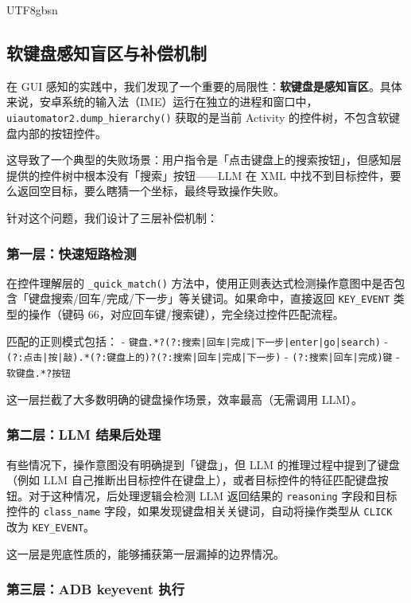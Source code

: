 \documentclass{article}
\begin{document}
\begin{CJK}{UTF8}{gbsn}
\subsection{软键盘感知盲区与补偿机制}

在 GUI 感知的实践中，我们发现了一个重要的局限性：\textbf{软键盘是感知盲区}。具体来说，安卓系统的输入法（IME）运行在独立的进程和窗口中，\texttt{uiautomator2.dump\_hierarchy()} 获取的是当前 Activity 的控件树，不包含软键盘内部的按钮控件。

这导致了一个典型的失败场景：用户指令是「点击键盘上的搜索按钮」，但感知层提供的控件树中根本没有「搜索」按钮——LLM 在 XML 中找不到目标控件，要么返回空目标，要么瞎猜一个坐标，最终导致操作失败。

针对这个问题，我们设计了三层补偿机制：

\subsubsection{第一层：快速短路检测}

在控件理解层的 \texttt{\_quick\_match()} 方法中，使用正则表达式检测操作意图中是否包含「键盘搜索/回车/完成/下一步」等关键词。如果命中，直接返回 \texttt{KEY\_EVENT} 类型的操作（键码 66，对应回车键/搜索键），完全绕过控件匹配流程。

匹配的正则模式包括：
- \texttt{键盘.*?(?:搜索|回车|完成|下一步|enter|go|search)}
- \texttt{(?:点击|按|敲).*(?:键盘上的)?(?:搜索|回车|完成|下一步)}
- \texttt{(?:搜索|回车|完成)键}
- \texttt{软键盘.*?按钮}

这一层拦截了大多数明确的键盘操作场景，效率最高（无需调用 LLM）。

\subsubsection{第二层：LLM 结果后处理}

有些情况下，操作意图没有明确提到「键盘」，但 LLM 的推理过程中提到了键盘（例如 LLM 自己推断出目标控件在键盘上），或者目标控件的特征匹配键盘按钮。对于这种情况，后处理逻辑会检测 LLM 返回结果的 \texttt{reasoning} 字段和目标控件的 \texttt{class\_name} 字段，如果发现键盘相关关键词，自动将操作类型从 \texttt{CLICK} 改为 \texttt{KEY\_EVENT}。

这一层是兜底性质的，能够捕获第一层漏掉的边界情况。

\subsubsection{第三层：ADB keyevent 执行}


\end{CJK}
\end{document}
